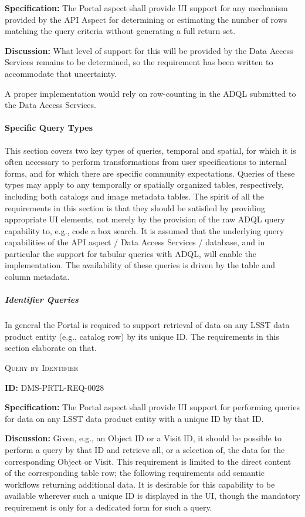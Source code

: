 \documentclass[SE,toc]{lsstdoc}
\begin{document}
\textbf{Specification:}
The Portal aspect shall provide UI support for any mechanism provided by the API Aspect for determining or estimating the number of rows matching the query criteria without generating a full return set.

\textbf{Discussion:}
What level of support for this will be provided by the Data Access Services remains to be determined, so the requirement has been written to accommodate that uncertainty.

A proper implementation would rely on row-counting in the ADQL submitted to the Data Access Services.

\paragraph{Specific Query Types}\hfill  %

This section covers two key types of queries, temporal and spatial, for which it is often necessary to perform transformations from user specifications to internal forms, and for which there are specific community expectations.
Queries of these types may apply to any temporally or spatially organized tables, respectively, including both catalogs and image metadata tables.
The spirit of all the requirements in this section is that they should be satisfied by providing appropriate UI elements, not merely by the provision of the raw ADQL query capability to, e.g., code a box search.
It is assumed that the underlying query capabilities of the API aspect / Data Access Services / database, and in particular the support for tabular queries with ADQL, will enable the implementation.
The availability of these queries is driven by the table and column metadata.

\subparagraph{Identifier Queries}\hfill  %

In general the Portal is required to support retrieval of data on any LSST data product entity (e.g., catalog row) by its unique ID.  The requirements in this section elaborate on that.

\textsc{Query by Identifier}

\label{DMS-PRTL-REQ-0028}
\textbf{ID:} DMS-PRTL-REQ-0028

\textbf{Specification:}
The Portal aspect shall provide UI support for performing queries for data on any LSST data product entity with a unique ID by that ID.

\textbf{Discussion:}
Given, e.g., an Object ID or a Visit ID, it should be possible to perform a query by that ID and retrieve all, or a selection of, the data for the corresponding Object or Visit.  This requirement is limited to the direct content of the corresponding table row; the following requirements add semantic workflows returning additional data.
It is desirable for this capability to be available wherever such a unique ID is displayed in the UI, though the mandatory requirement is only for a dedicated form for such a query.
\end{document}
